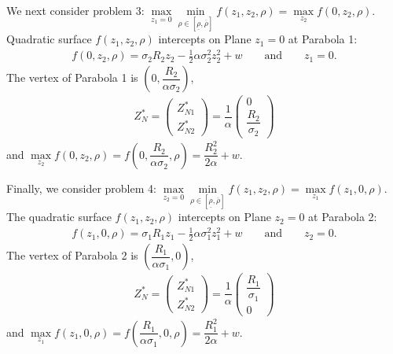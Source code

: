 \documentclass[10pt]{article}
\begin{document}
We next consider problem 3: $ \max\limits_{z_1 = 0} \min\limits_{\rho \in [\underline{\rho}, \overline{\rho}]} f (z_1, z_2, \rho) = \max\limits_{z_2} f (0, z_2, \rho) $.
Quadratic surface $ f (z_1, z_2, \rho) $ intercepts on Plane $ z_1 = 0 $ at Parabola 1:
\begin{eqnarray*}
f (0, z_2, \rho) = \sigma_2 R_2 z_2 - \frac12 \alpha \sigma_2^2 z_2^2 + w \qquad \text{and} \qquad z_1 = 0.
\end{eqnarray*}
The vertex of Parabola 1 is $ \left( 0, \dfrac{R_2}{\alpha \sigma_2} \right) $, 
\begin{eqnarray}
Z_N^* = \left( \begin{matrix} Z_{N 1}^* \\ Z_{N 2}^* \end{matrix} \right) = \dfrac1{\alpha} \left( \begin{matrix} 0 \\ \dfrac{R_2}{\sigma_2} \end{matrix} \right)
\end{eqnarray}
and $ \max\limits_{z_2} f (0, z_2, \rho) = f \left( 0, \dfrac{R_2}{\alpha \sigma_2}, \rho \right) = \dfrac{R_2^2}{2 \alpha} + w $.

Finally, we consider problem 4: $ \max\limits_{z_2 = 0} \min\limits_{\rho \in [\underline{\rho}, \overline{\rho}]} f (z_1, z_2, \rho) = \max\limits_{z_1} f (z_1, 0, \rho) $.
The quadratic surface $ f (z_1, z_2, \rho) $ intercepts on Plane $ z_2 = 0 $ at Parabola 2:
\begin{eqnarray*}
f (z_1, 0, \rho) = \sigma_1 R_1 z_1 - \frac12 \alpha \sigma_1^2 z_1^2 + w \qquad \text{and} \qquad z_2 = 0.
\end{eqnarray*}
The vertex of Parabola 2 is $ \left( \dfrac{R_1}{\alpha \sigma_1}, 0 \right) $,
\begin{eqnarray}
Z_N^* = \left( \begin{matrix} Z_{N 1}^* \\ Z_{N 2}^* \end{matrix} \right) = \dfrac1{\alpha} \left( \begin{matrix} \dfrac{R_1}{\sigma_1} \\ 0 \end{matrix} \right)
\end{eqnarray}
and $ \max\limits_{z_1} f (z_1, 0, \rho) = f \left( \dfrac{R_1}{\alpha \sigma_1}, 0, \rho \right) =\dfrac{R_1^2}{2 \alpha} + w $.
\end{document}
